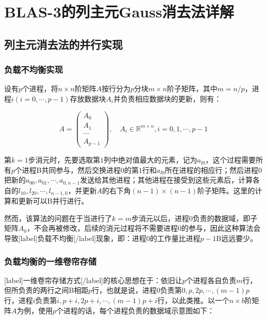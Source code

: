 \documentclass[UTF8,nofonts]{ctexart}
\begin{document}
\section*{BLAS-3的列主元Gauss消去法详解}

\subsection*{列主元消去法的并行实现}

\subsubsection*{负载不均衡实现}

设有$p$个进程，将$n \times n$阶矩阵$A$按行分为$p$分块$m \times n$阶子矩阵，其中$m=n/p$，进程$i(i=0,\cdots,p-1)$存放数据块$A_i$并负责相应数据块的更新，则有：

\[
A=\begin{pmatrix}A_0\\A_1\\\cdots\\A_{p-1}\end{pmatrix},\quad
A_i\in\mathbb{R}^{m \times n},i=0,1,\cdots,p-1
\]

第$k=1$步消元时，先要选取第$1$列中绝对值最大的元素，记为$a_{l0}$，这个过程需要所有$p$个进程B共同参与，然后交换进程$0$的第$1$行和$a_{l0}$所在进程的相应行；然后进程$0$把新的$a_{00},a_{01},\cdots,a_{0,n-1}$发送给其他进程；其他进程在接受到这些元素后，计算各自的$l_{10},l_{20},\cdots,l_{n-1,0}$，并更新$A$的右下角$(n-1)\times(n-1)$阶子矩阵。这里的计算和更新可以B并行进行。

然而，该算法的问题在于当进行了$k=m$步消元以后，进程$0$负责的数据域，即子矩阵$A_0$，不会再被修改，后续的消元过程将不需要进程$0$的参与，因此这种算法会导致[label]负载不均衡[/label]现象，即：进程$0$的工作量比进程$p-1$B远远要少。

\subsubsection*{负载均衡的一维卷帘存储}

[label]一维卷帘存储方式[/label]的核心思想在于：依旧让$p$个进程各自负责$m$行，但所负责的两行之间B相距$p$行，也就是说，进程$0$负责第$0,p,2p,\cdots,(m-1)p$行，进程$i$负责第$i,p+i,2p+i,\cdots,(m-1)p+i$行，以此类推。以一个$n \times b$阶矩阵$A$为例，使用$p$个进程的话，每个进程负责的数据域示意图如下：
\end{document}
